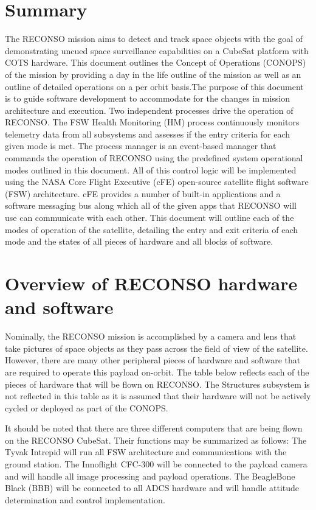 \documentclass{article}
\begin{document}
\newpage


\section*{Summary}

The RECONSO mission aims to detect and track space objects with the goal of demonstrating uncued space surveillance capabilities on a CubeSat platform with COTS hardware. This document outlines the Concept of Operations (CONOPS) of the mission by providing a day in the life outline of the mission as well as an outline of detailed operations on a per orbit basis.The purpose of this document is to guide software development to accommodate for the changes in mission architecture and execution.
Two independent processes drive the operation of RECONSO. The FSW Health Monitoring (HM) process continuously monitors telemetry data from all subsystems and assesses if the entry criteria for each given mode is met. The process manager is an event-based manager that commands the operation of RECONSO using the predefined system operational modes outlined in this document. All of this control logic will be implemented using the NASA Core Flight Executive (cFE) open-source satellite flight software (FSW) architecture. cFE provides a number of built-in applications and a software messaging bus along which all of the given apps that RECONSO will use can communicate with each other. This document will outline each of the modes of operation of the satellite, detailing the entry and exit criteria of each mode and the states of all pieces of hardware and all blocks of software.

\section{Overview of RECONSO hardware and software}

Nominally, the RECONSO mission is accomplished by a camera and lens that take pictures of space objects as they pass across the field of view of the satellite. However, there are many other peripheral pieces of hardware and software that are required to operate this payload on-orbit. The table below reflects each of the pieces of hardware that will be flown on RECONSO. The Structures subsystem is not reflected in this table as it is assumed that their hardware will not be actively cycled or deployed as part of the CONOPS.

It should be noted that there are three different computers that are being flown on the RECONSO CubeSat. Their functions may be summarized as follows: The Tyvak Intrepid will run all FSW architecture and communications with the ground station. The Innoflight CFC-300 will be connected to the payload camera and will handle all image processing and payload operations. The BeagleBone Black (BBB) will be connected to all ADCS hardware and will handle attitude determination and control implementation.
\end{document}
